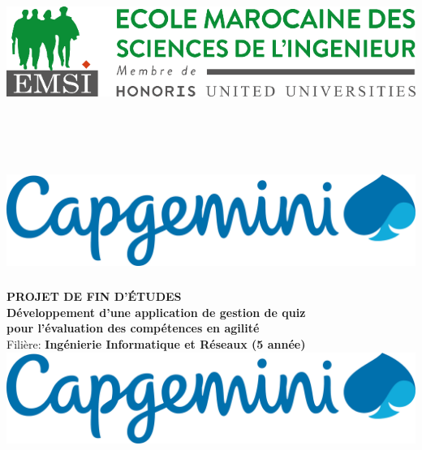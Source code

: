 \documentclass[12pt,a4paper]{report}
\begin{document}
\thispagestyle{empty} %

\begin{center}

\begin{minipage}{0.45\textwidth}\centering
  \includegraphics[height=6.5cm]{latex_media/media/image1.png}
\end{minipage}\hfill
\begin{minipage}{0.45\textwidth}\centering
  \includegraphics[height=3.5cm]{latex_media/media/image3.png}
\end{minipage}

\vspace{1cm}

{\Large \textbf{PROJET DE FIN D'ÉTUDES}}\\[0.5cm]

{\Large \textbf{Développement d'une application de gestion de quiz \\
pour l'évaluation des compétences en agilité}}\\[1cm]

{\large Filière: \textbf{Ingénierie Informatique et Réseaux (5\ieme{} année)}}\\[1.2cm]

\includegraphics[height=3cm]{latex_media/media/image3.png}\\[0.4cm]


\end{center}
\end{document}

